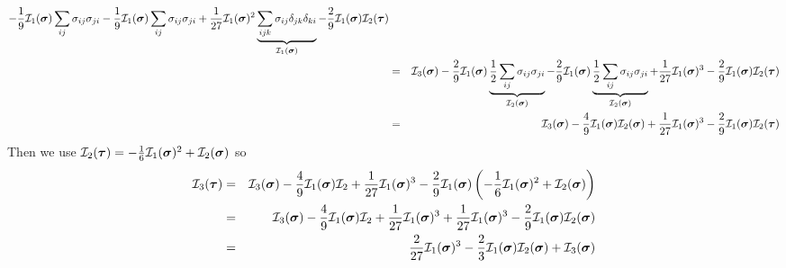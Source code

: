 \begin{eqnarray}
-\frac19 {\cal I}_1(\bm\sigma)  \sum_{ij} \sigma_{ij}\sigma_{ji} 
-\frac19 {\cal I}_1(\bm\sigma)  \sum_{ij} \sigma_{ij}\sigma_{ji} 
+\frac{1}{27} {\cal I}_1(\bm\sigma) ^2
\underbrace{\sum_{ijk}  \sigma_{ij}   \delta_{jk} \delta_{ki} }_{{\cal I}_1(\bm\sigma) }
-\frac29  {\cal I}_1(\bm\sigma)      {\cal I}_2(\bm\tau)
\nonumber\\
&=& 
{\cal I}_3(\bm\sigma)
-\frac29 {\cal I}_1(\bm\sigma)  \underbrace{\frac12 \sum_{ij} \sigma_{ij}\sigma_{ji} }_{{\cal I}_2(\bm\sigma)}
-\frac29 {\cal I}_1(\bm\sigma)  \underbrace{\frac12 \sum_{ij} \sigma_{ij}\sigma_{ji} }_{{\cal I}_2(\bm\sigma)}
+\frac{1}{27} {\cal I}_1(\bm\sigma)^3
-\frac29  {\cal I}_1(\bm\sigma)   {\cal I}_2(\bm\tau) 
\nonumber\\
&=& 
{\cal I}_3(\bm\sigma)
-\frac49 {\cal I}_1(\bm\sigma)  {\cal I}_2(\bm\sigma) 
+\frac{1}{27} {\cal I}_1(\bm\sigma) ^3
-\frac29  {\cal I}_1(\bm\sigma)     {\cal I}_2(\bm\tau) \nonumber
\end{eqnarray}
Then we use ${\cal I}_2(\bm\tau) = -\frac16 {\cal I}_1(\bm\sigma)^2 + {\cal I}_2(\bm\sigma)$ so 
\begin{eqnarray}
{\cal I}_3(\bm\tau) 
&=& 
{\cal I}_3(\bm\sigma)  -\frac49 {\cal I}_1(\bm\sigma)  {\cal I}_2   
+\frac{1}{27} {\cal I}_1(\bm\sigma) ^3   -\frac29  {\cal I}_1(\bm\sigma)   
\left(-\frac16 {\cal I}_1(\bm\sigma) ^2 + {\cal I}_2(\bm\sigma)   \right) \nonumber\\
&=& 
{\cal I}_3(\bm\sigma)  -\frac49 {\cal I}_1(\bm\sigma)  {\cal I}_2   +\frac{1}{27} {\cal I}_1(\bm\sigma)^3   
+\frac{1}{27}  {\cal I}_1(\bm\sigma) ^3  -\frac29  {\cal I}_1(\bm\sigma)   {\cal I}_2(\bm\sigma) \nonumber\\
&=& \frac{2}{27} {\cal I}_1(\bm\sigma)^3 
-\frac23 {\cal I}_1(\bm\sigma){\cal I}_2(\bm\sigma) + {\cal I}_3(\bm \sigma) \nonumber
\end{eqnarray}







\newpage

